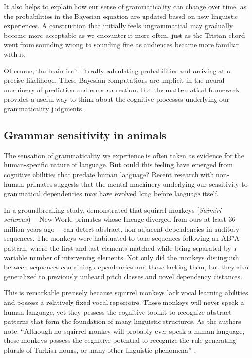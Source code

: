 It also helps to explain how our sense of grammaticality can change over time, as the probabilities in the Bayesian equation are updated based on new linguistic experiences. A construction that initially feels ungrammatical may gradually become more acceptable as we encounter it more often, just as the Tristan chord went from sounding wrong to sounding fine as audiences became more familiar with it.

Of course, the brain isn't literally calculating probabilities and arriving at a precise likelihood. These Bayesian computations are implicit in the neural machinery of prediction and error correction. But the mathematical framework provides a useful way to think about the cognitive processes underlying our grammaticality judgments.

\subsection{Grammar sensitivity in animals}

The sensation of grammaticality we experience is often taken as evidence for the human-specific nature of language. But could this feeling have emerged from cognitive abilities that predate human language? Recent research with non-human primates suggests that the mental machinery underlying our sensitivity to grammatical dependencies may have evolved long before language itself.

In a groundbreaking study, \citet{Ravignani2013} demonstrated that squirrel monkeys (\textit{Saimiri sciureus})~-- New World primates whose lineage diverged from ours at least 36 million years ago~-- can detect abstract, non-adjacent dependencies in auditory sequences. The monkeys were habituated to tone sequences following an AB$^n$A pattern, where the first and last elements matched while being separated by a variable number of intervening elements. Not only did the monkeys distinguish between sequences containing dependencies and those lacking them, but they also generalized to previously unheard pitch classes and novel dependency distances.

This is remarkable precisely because squirrel monkeys lack vocal learning abilities and possess a relatively fixed vocal repertoire. These monkeys will never speak a human language, yet they possess the cognitive toolkit to recognize abstract patterns that form the foundation of many linguistic structures. As the authors note, ``Although no squirrel monkey will probably ever speak a human language, these monkeys possess the cognitive potential to recognize the rule generating plurals of Turkish nouns, or many other linguistic phenomena'' \citep[4]{Ravignani2013}.

